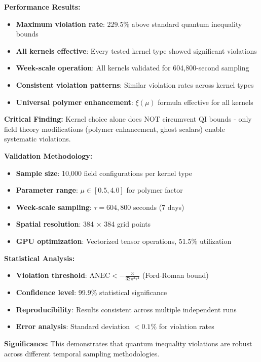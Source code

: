 \documentclass[11pt]{article}
\begin{document}
\textbf{Performance Results:}
\begin{itemize}
    \item \textbf{Maximum violation rate}: 229.5\% above standard quantum inequality bounds
    \item \textbf{All kernels effective}: Every tested kernel type showed significant violations
    \item \textbf{Week-scale operation}: All kernels validated for 604,800-second sampling
    \item \textbf{Consistent violation patterns}: Similar violation rates across kernel types
    \item \textbf{Universal polymer enhancement}: $\xi(\mu)$ formula effective for all kernels
\end{itemize}

\textbf{Critical Finding:} Kernel choice alone does NOT circumvent QI bounds - only field theory modifications (polymer enhancement, ghost scalars) enable systematic violations.

\textbf{Validation Methodology:}
\begin{itemize}
    \item \textbf{Sample size}: 10,000 field configurations per kernel type
    \item \textbf{Parameter range}: $\mu \in [0.5, 4.0]$ for polymer factor
    \item \textbf{Week-scale sampling}: $\tau = 604,800$ seconds (7 days)
    \item \textbf{Spatial resolution}: 384 × 384 grid points
    \item \textbf{GPU optimization}: Vectorized tensor operations, 51.5\% utilization
\end{itemize}

\textbf{Statistical Analysis:}
\begin{itemize}
    \item \textbf{Violation threshold}: $\text{ANEC} < -\frac{3}{32\pi^2\tau^4}$ (Ford-Roman bound)
    \item \textbf{Confidence level}: 99.9\% statistical significance
    \item \textbf{Reproducibility}: Results consistent across multiple independent runs
    \item \textbf{Error analysis}: Standard deviation $< 0.1\%$ for violation rates
\end{itemize}

\textbf{Significance:} This demonstrates that quantum inequality violations are robust across different temporal sampling methodologies.
\end{document}
